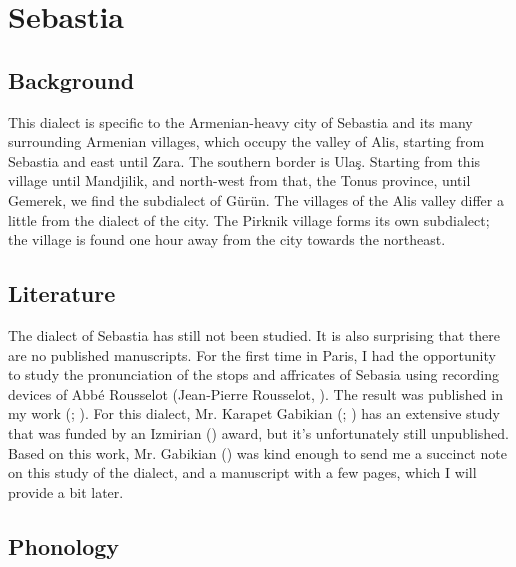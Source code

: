 \chapter{Sebastia} \label{chapter:Sebastia}
\section{Background}

\begin{adjarianpage}\label{page:225}\end{adjarianpage}%


This dialect is specific to the Armenian-heavy city of Sebastia and its many surrounding Armenian villages, which occupy the valley of Alis, starting from Sebastia and east until Zara. The southern border is Ulaş. Starting from this village until Mandjilik, and north-west from that, the Tonus province, until Gemerek, we find the subdialect of Gürün. The villages of the Alis valley differ a little from the dialect of the city. The Pirknik village forms its own subdialect; the village is found one hour away from the city towards the northeast. 

\section{Literature}




The dialect of Sebastia has still not been studied. It is also surprising that there are no published manuscripts. For the first time in Paris, I had the opportunity to study the pronunciation of the stops and affricates of Sebasia using recording devices of Abbé Rousselot (Jean-Pierre Rousselot, ). The result was published in my work (\citealt{Adjarian-1899-ArmenianExplosives};   ). For this dialect, Mr. Karapet Gabikian (; ) has an extensive study that was funded by an Izmirian () award, but it's unfortunately still unpublished. Based on this work, Mr. Gabikian () was kind enough to send me a succinct note on this study of the dialect, and a manuscript with a few pages, which I will provide a bit later. 

\section{Phonology}
